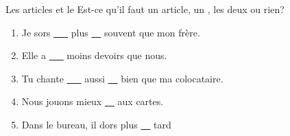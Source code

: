 \begin{frame}{Les articles et le }
  Est-ce qu'il faut un article, un , les deux ou rien? \\
  \begin{enumerate}
    \item Je sors \underline{\ \ \ } plus \underline{\ \ } souvent que mon frère.
    \item Elle a \underline{\ \ \ } moins \underline{} devoirs que nous.
    \item Tu chante \underline{\ \ \ } aussi \underline{\ \ } bien que ma colocataire.
    \item Nous jouons \underline{} mieux \underline{\ \ } aux cartes.
    \item Dans le bureau, il dors \underline{} plus \underline{\ \ } tard
  \end{enumerate}
\end{frame}